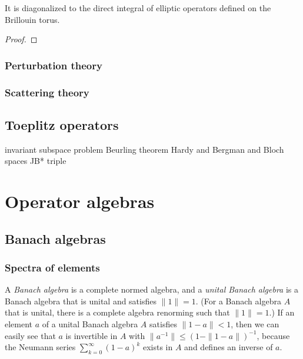 \documentclass{../../large}
\begin{document}
\begin{prb}
It is diagonalized to the direct integral of elliptic operators defined on the Brillouin torus.
\end{prb}
\begin{proof}
\end{proof}



\section{Perturbation theory}

\section{Scattering theory}




\chapter{Toeplitz operators}

invariant subspace problem
Beurling theorem
Hardy and Bergman and Bloch spaces
JB* triple





\part{Operator algebras}
\chapter{Banach algebras}

\section{Spectra of elements}

A \emph{Banach algebra} is a complete normed algebra, and a \emph{unital Banach algebra} is a Banach algebra that is unital and satisfies $\|1\|=1$.
(For a Banach algebra $A$ that is unital, there is a complete algebra renorming such that $\|1\|=1$.)
If an element $a$ of a unital Banach algebra $A$ satisfies $\|1-a\|<1$, then we can easily see that $a$ is invertible in $A$ with $\|a^{-1}\|\le(1-\|1-a\|)^{-1}$, because the Neumann series $\sum_{k=0}^\infty(1-a)^k$ exists in $A$ and defines an inverse of $a$.
\end{document}
